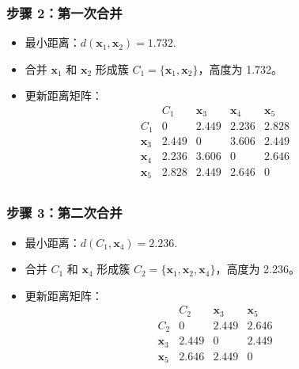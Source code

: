 \documentclass{article}
\begin{document}
\subsubsection*{步骤 2：第一次合并}
\begin{itemize}
    \item 最小距离：\( d(\mathbf{x}_1, \mathbf{x}_2) = 1.732 \).
    \item 合并 \( \mathbf{x}_1 \) 和 \( \mathbf{x}_2 \) 形成簇 \( C_1 = \{ \mathbf{x}_1, \mathbf{x}_2 \} \)，高度为 1.732。
    \item 更新距离矩阵：
    \[
    \begin{array}{c|cccc}
     & C_1 & \mathbf{x}_3 & \mathbf{x}_4 & \mathbf{x}_5 \\
    \hline
    C_1 & 0 & 2.449 & 2.236 & 2.828 \\
    \mathbf{x}_3 & 2.449 & 0 & 3.606 & 2.449 \\
    \mathbf{x}_4 & 2.236 & 3.606 & 0 & 2.646 \\
    \mathbf{x}_5 & 2.828 & 2.449 & 2.646 & 0 \\
    \end{array}
    \]
\end{itemize}

\subsubsection*{步骤 3：第二次合并}
\begin{itemize}
    \item 最小距离：\( d(C_1, \mathbf{x}_4) = 2.236 \).
    \item 合并 \( C_1 \) 和 \( \mathbf{x}_4 \) 形成簇 \( C_2 = \{ \mathbf{x}_1, \mathbf{x}_2, \mathbf{x}_4 \} \)，高度为 2.236。
    \item 更新距离矩阵：
    \[
    \begin{array}{c|ccc}
     & C_2 & \mathbf{x}_3 & \mathbf{x}_5 \\
    \hline
    C_2 & 0 & 2.449 & 2.646 \\
    \mathbf{x}_3 & 2.449 & 0 & 2.449 \\
    \mathbf{x}_5 & 2.646 & 2.449 & 0 \\
    \end{array}
    \]
\end{itemize}
\end{document}
